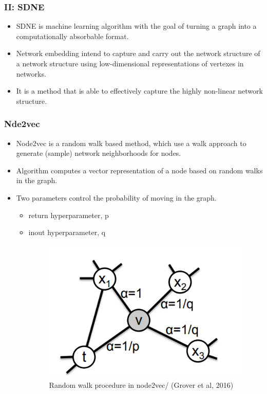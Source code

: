 \documentclass{beamer}
\begin{document}
\begin{frame}
\frametitle{ II: SDNE }
\begin{itemize}
\item  SDNE is machine learning algorithm  with the goal of turning a graph into a computationally  absorbable format. 
\vspace{10pt}
\item  Network embedding intend to capture and carry out the network structure of a network structure using low-dimensional representations of vertexes in networks. 
\vspace{10pt}
  \item   It is  a method that is
able to effectively capture the highly non-linear network structure.
\end{itemize}


\end{frame}

\begin{frame}
\frametitle{ Nde2vec}
\begin{itemize}
\item  Node2vec is a random walk based method, which  use a walk approach to generate (sample) network neighborhoods for nodes. 
\vspace{10 pt}
\item Algorithm computes a vector representation of a node based on random walks in the graph.
\vspace{10 pt}
\item  Two parameters control the probability of moving in the graph.
\begin{itemize}
\item return hyperparameter, p 
\item inout hyperparameter, q 
\begin{figure}[h!]
  \centering
  \includegraphics[width=.4\linewidth]{n2v.png}
  \caption{Random walk procedure in node2vec/ (Grover et al, 2016)}
  \label{fig:fig1}
\end{figure}
\end{itemize}

\end{itemize}
\end{frame}
\end{document}
